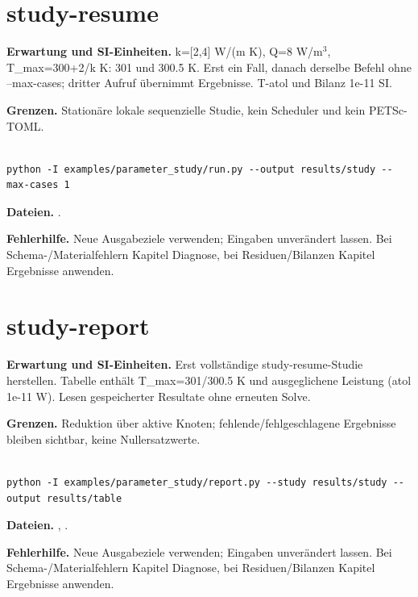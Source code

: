 

\section{study-resume}\label{recipe:study-resume}

\textbf{Erwartung und SI-Einheiten.} k=[2,4] W/(m K), Q=8 W/m$^3$, T\_max=300+2/k K: 301 und 300.5 K. Erst ein Fall, danach derselbe Befehl ohne --max-cases; dritter Aufruf übernimmt Ergebnisse. T-atol und Bilanz 1e-11 SI.

\textbf{Grenzen.} Stationäre lokale sequenzielle Studie, kein Scheduler und kein PETSc-TOML.

\begin{lstlisting}

python -I examples/parameter_study/run.py --output results/study --max-cases 1

\end{lstlisting}

\textbf{Dateien.} .

\textbf{Fehlerhilfe.} Neue Ausgabeziele verwenden; Eingaben unverändert lassen. Bei Schema-/Materialfehlern Kapitel Diagnose, bei Residuen/Bilanzen Kapitel Ergebnisse anwenden.



\section{study-report}\label{recipe:study-report}

\textbf{Erwartung und SI-Einheiten.} Erst vollständige study-resume-Studie herstellen. Tabelle enthält T\_max=301/300.5 K und ausgeglichene Leistung (atol 1e-11 W). Lesen gespeicherter Resultate ohne erneuten Solve.

\textbf{Grenzen.} Reduktion über aktive Knoten; fehlende/fehlgeschlagene Ergebnisse bleiben sichtbar, keine Nullersatzwerte.

\begin{lstlisting}

python -I examples/parameter_study/report.py --study results/study --output results/table

\end{lstlisting}

\textbf{Dateien.} , .

\textbf{Fehlerhilfe.} Neue Ausgabeziele verwenden; Eingaben unverändert lassen. Bei Schema-/Materialfehlern Kapitel Diagnose, bei Residuen/Bilanzen Kapitel Ergebnisse anwenden.

